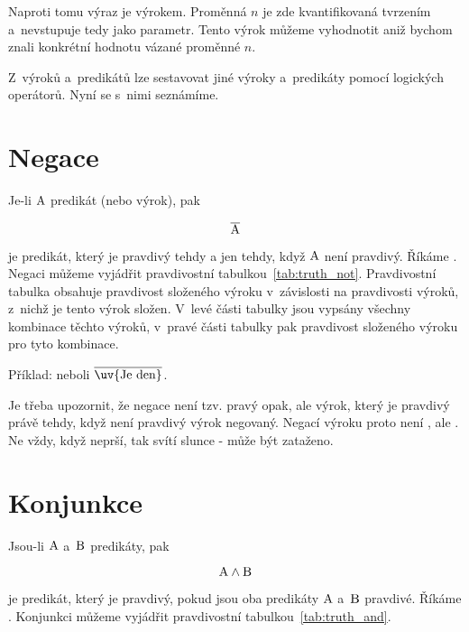 Naproti tomu výraz  je výrokem. Proměnná \(n\) je zde kvantifikovaná tvrzením  a~nevstupuje tedy jako parametr. Tento výrok můžeme vyhodnotit aniž bychom znali konkrétní hodnotu vázané proměnné \(n\).

Z~výroků a~predikátů lze sestavovat jiné výroky a~predikáty pomocí logických operátorů. Nyní se s~nimi seznámíme.

\section{Negace}

Je-li \(\mathrm{A}\) predikát (nebo výrok), pak

\begin{equation}
\overline{\mathrm{A}} 
\end{equation}

je predikát, který je pravdivý tehdy a jen tehdy, když \(\mathrm{A}\) není pravdivý. Říkáme . Negaci můžeme vyjádřit pravdivostní tabulkou~\ref{tab:truth_not}. Pravdivostní tabulka obsahuje pravdivost složeného výroku v~závislosti na pravdivosti výroků, z~nichž je tento výrok složen. V~levé části tabulky jsou vypsány všechny kombinace těchto výroků, v~pravé části tabulky pak pravdivost složeného výroku pro tyto kombinace.  


Příklad:  neboli \(\overline{\predicate{\text{\uv{Je den}}}}\).

Je třeba upozornit, že negace není tzv. pravý opak, ale výrok, který je pravdivý právě tehdy, když není pravdivý výrok negovaný. Negací výroku  proto není , ale . Ne vždy, když neprší, tak svítí slunce - může být zataženo.

\section{Konjunkce}

Jsou-li \(\mathrm{A}\) a~\(\mathrm{B}\) predikáty, pak

\begin{equation}
\mathrm{A} \land \mathrm{B} 
\end{equation}

je predikát, který je pravdivý, pokud jsou oba predikáty \(\mathrm{A}\) a~\(\mathrm{B}\) pravdivé. Říkáme .
Konjunkci můžeme vyjádřit pravdivostní tabulkou~\ref{tab:truth_and}.

